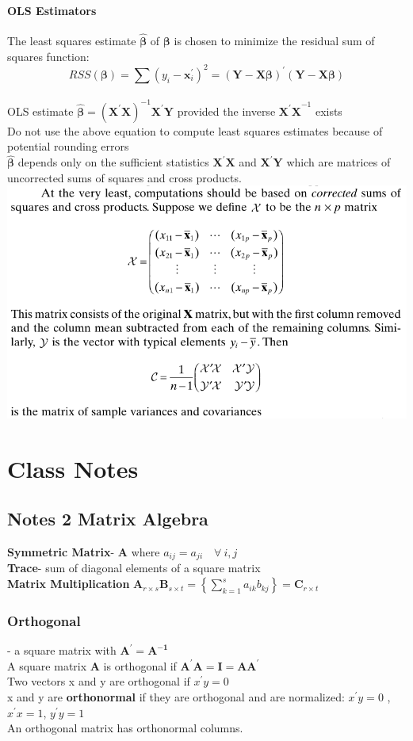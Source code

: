 \documentclass[openany]{book}
\newcommand{\B}{\beta}
\newcommand{\hb}{\hat{\beta}}
\numberwithin{equation}{section}
\begin{document}
\begin{flushleft}
\subsection{OLS Estimators}
The least squares estimate $\bm{\hb}$ of $\bm{\B}$ is chosen to minimize the residual sum of squares function:\\
\[RSS(\bm{\B})=\bm{\sum}(y_i-\bm{x}_i^{'})^2=(\bm{Y}-\bm{X\B})^{'}(\bm{Y}-\bm{X\B})\]\\
OLS estimate $\bm{\hb}=(\bm{X^{'}X})^{-1}\bm{X^{'}Y}$ provided the inverse $\bm{X^{'}X}^{-1}$ exists\\
Do not use the above equation to compute least squares estimates because of potential rounding errors\\
$\bm{\hb}$ depends only on the sufficient statistics $\bm{X^{'}X}$ and $\bm{X^{'}Y}$ which are matrices of uncorrected sums of squares and cross products.\\
\includegraphics[scale=.6]{covmat.png}\\
\part{Class Notes}
\chapter{Notes 2 Matrix Algebra}
\textbf{Symmetric Matrix}- $\bm{A}$ where $a_{ij}=a_{ji} \quad \forall \ i,j$\\
\textbf{Trace}- sum of diagonal elements of a square matrix\\
\textbf{Matrix Multiplication} $\bm{A}_{r\times s}\bm{B}_{s\times t}=\left\{\sum_{k=1}^{s}a_{ik}b_{kj} \right\}=\bm{C}_{r\times t}$\\
\section{Orthogonal}
- a square matrix with $\bm{A^{'}}=\bm{A^{-1}}$\\
A square matrix $\bm{A}$ is orthogonal if $\bm{A^{'}A}=\bm{I}=\bm{AA^{'}}$\\
Two vectors x and y are orthogonal if $x^{'}y=0$\\
x and y are \textbf{orthonormal} if they are orthogonal and are normalized: $x^{'}y=0$ , $x^{'}x=1$, $y^{'}y=1$\\
An orthogonal matrix has orthonormal columns.\\

\end{flushleft}
\end{document}
